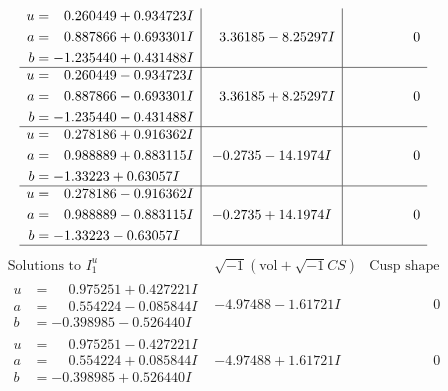 \documentclass[1p]{elsarticle_modified}
\theoremstyle{definition}
\newcommand{\I}{\sqrt{-1}}
\begin{document}
$$\begin{array}{c|c|c}
\begin{aligned}
u &= \phantom{-}0.260449 + 0.934723 I \\
a &= \phantom{-}0.887866 + 0.693301 I \\
b &= -1.235440 + 0.431488 I\end{aligned}
 & \phantom{-}3.36185 - 8.25297 I & \phantom{-0.000000 } 0 \\ \hline\begin{aligned}
u &= \phantom{-}0.260449 - 0.934723 I \\
a &= \phantom{-}0.887866 - 0.693301 I \\
b &= -1.235440 - 0.431488 I\end{aligned}
 & \phantom{-}3.36185 + 8.25297 I & \phantom{-0.000000 } 0 \\ \hline\begin{aligned}
u &= \phantom{-}0.278186 + 0.916362 I \\
a &= \phantom{-}0.988889 + 0.883115 I \\
b &= -1.33223 + 0.63057 I\end{aligned}
 & -0.2735 - 14.1974 I & \phantom{-0.000000 } 0 \\ \hline\begin{aligned}
u &= \phantom{-}0.278186 - 0.916362 I \\
a &= \phantom{-}0.988889 - 0.883115 I \\
b &= -1.33223 - 0.63057 I\end{aligned}
 & -0.2735 + 14.1974 I & \phantom{-0.000000 } 0\\
 \hline 
 \end{array}$$\newpage$$\begin{array}{c|c|c}  
\text{Solutions to }I^u_{1}& \I (\text{vol} + \sqrt{-1}CS) & \text{Cusp shape}\\
 \hline 
\begin{aligned}
u &= \phantom{-}0.975251 + 0.427221 I \\
a &= \phantom{-}0.554224 - 0.085844 I \\
b &= -0.398985 - 0.526440 I\end{aligned}
 & -4.97488 - 1.61721 I & \phantom{-0.000000 } 0 \\ \hline\begin{aligned}
u &= \phantom{-}0.975251 - 0.427221 I \\
a &= \phantom{-}0.554224 + 0.085844 I \\
b &= -0.398985 + 0.526440 I\end{aligned}
 & -4.97488 + 1.61721 I & \phantom{-0.000000 } 0 \\ \hline\begin{aligned}

\end{aligned}
\end{array}$$
\end{document}
